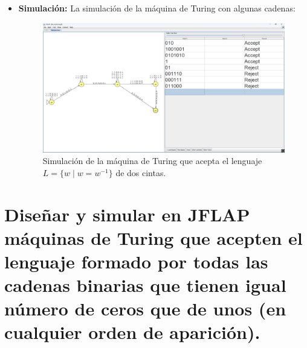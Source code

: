 \documentclass[11pt]{report}
\begin{document}
\begin{itemize}
  \item \textbf{Simulación:} La simulación de la máquina de Turing con algunas cadenas:
        \begin{figure}[H]
          \centering
          \includegraphics[scale=0.3]{img/MT_04_multiple_ribbon_simulation.png}
          \caption{Simulación de la máquina de Turing que acepta el lenguaje \(L = \{w \mid w = w^{-1}\}\) de dos cintas.}
          \label{fig:simulacion de la maquina de turing que acepta el lenguaje L = {w | w = w^{-1}} de dos cintas}
        \end{figure}
\end{itemize}

\newpage

\section{Diseñar y simular en JFLAP máquinas de Turing que acepten el lenguaje formado por todas las cadenas binarias que tienen igual número de ceros que de unos (en cualquier orden de aparición).}
\end{document}
